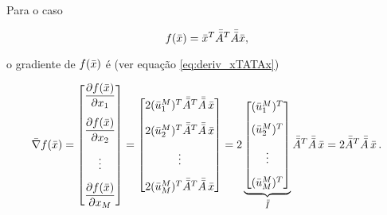 \begin{example}
    Para o caso

    \begin{equation}
    f(\bar{x}) = \bar{x}^T\bar{\bar{A}}^T\bar{\bar{A}}\bar{x},
    \end{equation}
    
    \noindent o gradiente de $f(\bar{x})$ é (ver equação \ref{eq:deriv_xTATAx})
    
    \begin{equation}
        \vect{\nabla}f(\vect{x}) =
        \begin{bmatrix}
        \dfrac{\partial f(\vect{x})}{\partial x_1} \vspace{0.3cm}\\
        \dfrac{\partial f(\vect{x})}{\partial x_2} \vspace{0.3cm}\\
        \vdots \vspace{0.3cm}\\
        \dfrac{\partial f(\vect{x})}{\partial x_M}
        \end{bmatrix}
        =
        \begin{bmatrix}
        2(\vect{u}_1^M)^T \mat{A}^T\mat{A}\thinspace\vect{x} \vspace{0.3cm}\\
        2(\vect{u}_2^M)^T \mat{A}^T\mat{A}\thinspace\vect{x} \vspace{0.3cm}\\
        \vdots \vspace{0.3cm}\\
        2(\vect{u}_M^M)^T \mat{A}^T\mat{A}\thinspace\vect{x}
        \end{bmatrix}
        =
        2
        \underbrace{
        \begin{bmatrix}
        (\vect{u}_1^M)^T  \vspace{0.3cm}\\
        (\vect{u}_2^M)^T \vspace{0.3cm}\\
        \vdots \vspace{0.3cm}\\
        (\vect{u}_M^M)^T
        \end{bmatrix}}_{\mat{I}}
        \mat{A}^T\mat{A}\thinspace\vect{x}
        =
        2\mat{A}^T\mat{A}\thinspace\vect{x} 
        \thinspace .
    \label{eq:grad_xTATAx}
    \end{equation}
\end{example}

